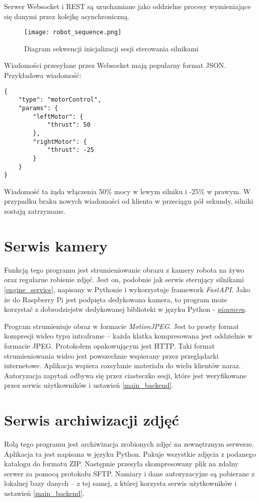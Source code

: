 Serwer Websocket i REST są uruchamiane jako oddzielne procesy wymieniające się danymi przez kolejkę asynchroniczną.

\begin{figure}[H]
    \centering \texttt{[image: robot\_sequence.png]}
    \caption{Diagram sekwencji inicjalizacji sesji sterowania silnikami}
    \label{rys:sequence}
\end{figure}

Wiadomości przesyłane przez Websocket mają popularny format JSON.
Przykładowa wiadomość:
\begin{verbatim}
{
    "type": "motorControl",
    "params": {
        "leftMotor": {
            "thrust": 50
        },
        "rightMotor": {
            "thrust": -25
        }
    }
}
\end{verbatim}
Wiadomość ta żąda włączenia 50\% mocy w lewym silniku i -25\% w prawym.
W przypadku braku nowych wiadomości od klienta w przeciągu pół sekundy, silniki zostają zatrzymane.

\section{Serwis kamery}
Funkcją tego programu jest strumieniowanie obrazu z kamery robota na żywo oraz regularne robienie zdjęć.
Jest on, podobnie jak serwis sterujący silnikami \ref{engine_service}, napisany w Pythonie i wykorzystuje framework \textit{FastAPI}.
Jako że do Raspberry Pi jest podpięta dedykowana kamera, to program może korzystać z dobrodziejstw dedykowanej biblioteki w języku Python - \href{https://picamera.readthedocs.io/en/release-1.13/#}{\textit{picamera}}.

Program strumieniuje obraz w formacie \textit{MotionJPEG}.
Jest to prosty format kompresji wideo typu intraframe -- każda klatka kompresowana jest oddzielnie w formacie JPEG.
Protokołem opakowującym jest HTTP.
Taki format strumieniowania wideo jest powszechnie wspierany przez przeglądarki internetowe.
Aplikacja wspiera rozsyłanie materiału do wielu klientów naraz.
Autoryzacja zapytań odbywa się przez ciasteczko sesji, które jest weryfikowane przez serwis użytkowników i ustawień \ref{main_backend}.

\section{Serwis archiwizacji zdjęć}
Rolą tego programu jest archiwizacja zrobionych zdjęć na zewnętrznym serwerze.
Aplikacja ta jest napisana w języku Python.
Pakuje wszystkie zdjęcia z podanego katalogu do formatu ZIP.
Następnie przesyła skompresowany plik na zdalny serwer za pomocą protokołu SFTP.
Namiary i dane autoryzacyjne są pobierane z lokalnej bazy danych -- z tej samej, z której korzysta serwis użytkowników i ustawień \ref{main_backend}.

